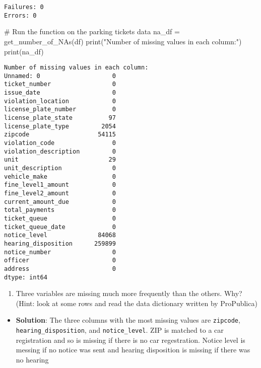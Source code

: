 \documentclass[
  letterpaper,
  DIV=11,
  numbers=noendperiod]{scrartcl}
\newenvironment{Shaded}{\begin{snugshade}}{\end{snugshade}}
\newcommand{\BuiltInTok}[1]{\textcolor[rgb]{0.00,0.23,0.31}{#1}}
\newcommand{\CommentTok}[1]{\textcolor[rgb]{0.37,0.37,0.37}{#1}}
\newcommand{\NormalTok}[1]{\textcolor[rgb]{0.00,0.23,0.31}{#1}}
\newcommand{\OperatorTok}[1]{\textcolor[rgb]{0.37,0.37,0.37}{#1}}
\newcommand{\StringTok}[1]{\textcolor[rgb]{0.13,0.47,0.30}{#1}}
\providecommand{\tightlist}{%
  \setlength{\itemsep}{0pt}\setlength{\parskip}{0pt}}\usepackage{longtable,booktabs,array}
\begin{document}
\begin{verbatim}
Failures: 0
Errors: 0
\end{verbatim}

\begin{Shaded}
\begin{Highlighting}[]
\CommentTok{\# Run the function on the parking tickets data}
\NormalTok{na\_df }\OperatorTok{=}\NormalTok{ get\_number\_of\_NAs(df)}
\BuiltInTok{print}\NormalTok{(}\StringTok{"Number of missing values in each column:"}\NormalTok{)}
\BuiltInTok{print}\NormalTok{(na\_df)}
\end{Highlighting}
\end{Shaded}

\begin{verbatim}
Number of missing values in each column:
Unnamed: 0                    0
ticket_number                 0
issue_date                    0
violation_location            0
license_plate_number          0
license_plate_state          97
license_plate_type         2054
zipcode                   54115
violation_code                0
violation_description         0
unit                         29
unit_description              0
vehicle_make                  0
fine_level1_amount            0
fine_level2_amount            0
current_amount_due            0
total_payments                0
ticket_queue                  0
ticket_queue_date             0
notice_level              84068
hearing_disposition      259899
notice_number                 0
officer                       0
address                       0
dtype: int64
\end{verbatim}

\begin{enumerate}
\def\labelenumi{\arabic{enumi}.}
\setcounter{enumi}{1}
\tightlist
\item
  Three variables are missing much more frequently than the others. Why?
  (Hint: look at some rows and read the data dictionary written by
  ProPublica)
\end{enumerate}

\begin{itemize}
\tightlist
\item
  \textbf{Solution}: The three columns with the most missing values are
  \texttt{zipcode}, \texttt{hearing\_disposition}, and
  \texttt{notice\_level}. ZIP is matched to a car registration and so is
  missing if there is no car regestration. Notice level is messing if no
  notice was sent and hearing disposition is missing if there was no
  hearing
\end{itemize}
\end{document}

